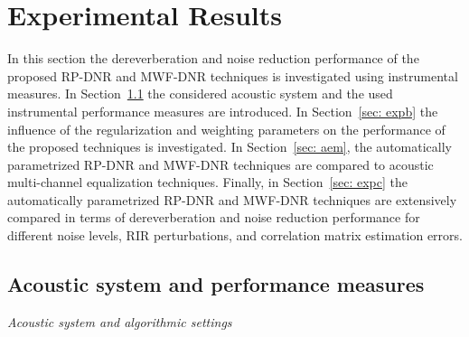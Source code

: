 \documentclass[draftcls,onecolumn,11pt]{IEEEtran}
\begin{document}
\section{Experimental Results}
\label{sec: exp}
In this section the dereverberation and noise reduction performance of the proposed RP-DNR and MWF-DNR techniques is investigated using instrumental measures.
In Section~\ref{sec: expa} the considered acoustic system and the used instrumental performance measures are introduced. 
In Section~\ref{sec: expb} the influence of the regularization and weighting parameters on the performance of the proposed techniques is investigated.
In Section~\ref{sec: aem}, the automatically parametrized RP-DNR and MWF-DNR techniques are compared to acoustic multi-channel equalization techniques.
Finally, in Section~\ref{sec: expc} the automatically parametrized RP-DNR and MWF-DNR techniques are extensively compared in terms of dereverberation and noise reduction performance for different noise levels, RIR perturbations, and correlation matrix estimation errors. 

\subsection{Acoustic system and performance measures}
\label{sec: expa}
\hspace{-0.38cm}\textit{Acoustic system and algorithmic settings} 
\end{document}
